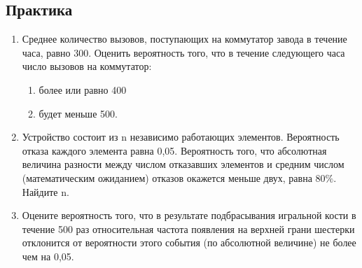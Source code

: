 \documentclass[a4paper, 14pt]{extarticle}
\begin{document}
\subsection*{Практика}
\begin{enumerate}
\item Среднее количество вызовов, поступающих на коммутатор завода в течение часа, равно  300. Оценить вероятность того, что в течение следующего часа число вызовов на коммутатор: 
\begin{enumerate}
\item более или равно 400
\item будет меньше 500.
\end{enumerate}

\item Устройство состоит из  n независимо работающих элементов. Вероятность отказа каждого элемента равна  0,05. 
Вероятность того, что абсолютная величина разности между числом отказавших элементов и средним числом (математическим ожиданием) отказов окажется меньше двух, равна $80\%$. Найдите n.


\item Оцените вероятность того, что в результате подбрасывания игральной кости в течение 500 раз относительная частота появления на верхней грани шестерки отклонится от вероятности этого события (по абсолютной величине) не более чем на 0,05. 




\end{enumerate}
\end{document}
